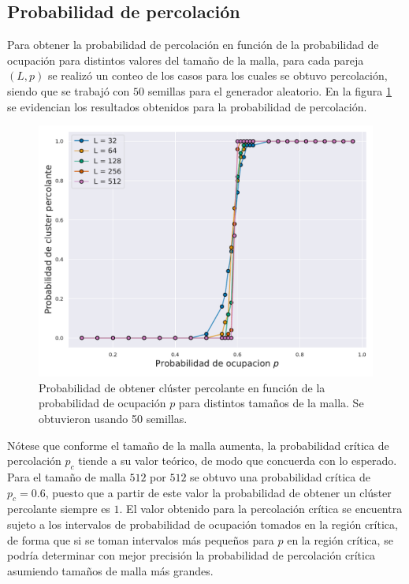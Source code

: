 \documentclass[%
 reprint,
 amsmath,amssymb,
 aps,
]{revtex4-2}
\begin{document}
\subsection{Probabilidad de percolación}

Para obtener la probabilidad de percolación en función de la probabilidad de ocupación para distintos valores del tamaño de la malla, para cada pareja $(L, p)$ se realizó un conteo de los casos para los cuales se obtuvo percolación, siendo que se trabajó con $50$ semillas para el generador aleatorio. En la figura \ref{fig: probabilidad} se evidencian los resultados obtenidos para la probabilidad de percolación.

\begin{figure}[H]
    \centering
    \includegraphics[width=1\linewidth]{Probabilidadcluster.pdf}
    \caption{Probabilidad de obtener clúster percolante en función de la probabilidad de ocupación $p$ para distintos tamaños de la malla. Se obtuvieron usando 50 semillas.}
    \label{fig: probabilidad}
\end{figure}

Nótese que conforme el tamaño de la malla aumenta, la probabilidad crítica de percolación $p_c$ tiende a su valor teórico, de modo que concuerda con lo esperado. Para el tamaño de malla $512$ por $512$ se obtuvo una probabilidad crítica de $p_c = 0.6$, puesto que a partir de este valor la probabilidad de obtener un clúster percolante siempre es $1$. El valor obtenido para la percolación crítica se encuentra sujeto a los intervalos de probabilidad de ocupación tomados en la región crítica, de forma que si se toman intervalos más pequeños para $p$ en la región crítica, se podría determinar con mejor precisión la probabilidad de percolación crítica asumiendo tamaños de malla más grandes.
\end{document}
